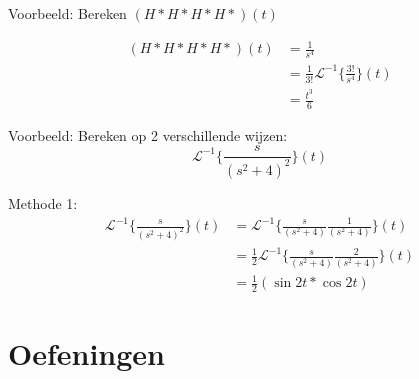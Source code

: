 \documentclass[12pt]{report}
\newcommand{\example}[2]{
    \hrulefill
    
    Voorbeeld: #1
    
    #2
    
    \hrulefill
}
\begin{document}
\example{Bereken $(H*H*H*H*)(t)$}
{
    \begin{equation*}
     \begin{split}
      (H*H*H*H*)(t) & = \frac{1}{s^4} \\
                    & = \frac{1}{3!}\mathcal{L}^{-1}\bigg\{\frac{3!}{s^4}\bigg\}(t) \\
                    & = \frac{t^3}{6}
     \end{split}
    \end{equation*}

}
\example{Bereken op 2 verschillende wijzen:
    $$\mathcal{L}^{-1}\bigg\{\frac{s}{(s^2 + 4)^2}\bigg\}(t)$$
}{
    Methode 1:
    \begin{equation*}
     \begin{split}
      \mathcal{L}^{-1}\bigg\{\frac{s}{(s^2 + 4)^2}\bigg\}(t) & = \mathcal{L}^{-1}\bigg\{\frac{s}{(s^2 + 4)}\frac{1}{(s^2 + 4)}\bigg\}(t) \\
                                                             & = \frac{1}{2}\mathcal{L}^{-1}\bigg\{\frac{s}{(s^2 + 4)}\frac{2}{(s^2 + 4)}\bigg\}(t) \\
                                                             & = \frac{1}{2}(\sin 2t * \cos 2t)
     \end{split}
    \end{equation*}

}
\part{Oefeningen}
\end{document}
